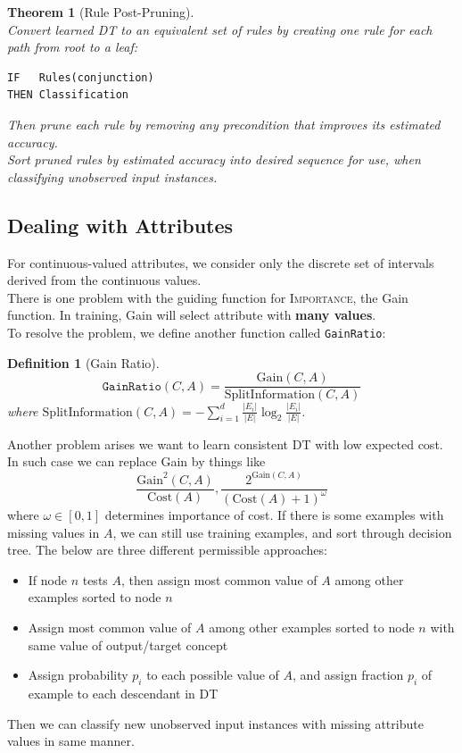 \documentclass[12pt]{article}
\newtheorem{definition}{Definition}[section]
\newtheorem{theorem}{Theorem}[section]
\theoremstyle{definition}
\begin{document}
\begin{theorem}[Rule Post-Pruning]
\hfill\\\normalfont Convert learned DT to an equivalent set of rules by creating one rule for each path from root to a leaf:
\begin{verbatim}
IF   Rules(conjunction)
THEN Classification
\end{verbatim}
Then prune each rule by removing any precondition that improves its estimated accuracy.\\
Sort pruned rules by estimated accuracy into desired sequence for use, when classifying unobserved input instances.
\end{theorem}
\subsection{Dealing with Attributes}
For continuous-valued attributes, we consider only the discrete set of intervals derived from the continuous values.\\
There is one problem with the guiding function for \textsc{Importance}, the Gain function. In training, Gain will select attribute with \textbf{many values}.\\
To resolve the problem, we define another function called \texttt{GainRatio}:
\begin{definition}[Gain Ratio]
\hfill\\\normalfont 
\[
\texttt{GainRatio}(C,A)= \frac{\mathrm{Gain}(C,A)}{\mathrm{SplitInformation}(C,A)}
\]
where $\mathrm{SplitInformation}(C,A)=-\sum_{i=1}^d\frac{|E_i|}{|E|}\log_2\frac{|E_i|}{|E|}$.
\end{definition}
Another problem arises we want to learn consistent DT with low expected cost. In such case we can replace Gain by things like
\[
\frac{\mathrm{Gain}^2(C,A)}{\mathrm{Cost}(A)}, \frac{2^{\mathrm{Gain}(C,A)}}{(\mathrm{Cost}(A)+1)^\omega}
\]
where $\omega\in[0,1]$ determines importance of cost.
If there is some examples with missing values in $A$, we can still use training examples, and sort through decision tree. The below are three different permissible approaches:
\begin{itemize}
	\item If node $n$ tests $A$, then assign most common value of $A$ among other examples sorted to node $n$
	\item Assign most common value of $A$ among other examples sorted to node $n$ with same value of output/target concept
	\item Assign probability $p_i$ to each possible value of $A$, and assign fraction $p_i$ of example to each descendant in DT
\end{itemize}
Then we can classify new unobserved input instances with missing attribute values in same manner.
\end{document}
